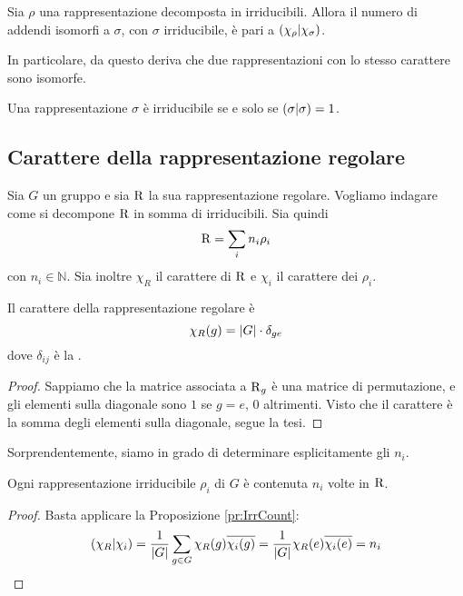 \begin{myprop}\label{pr:IrrCount}
  Sia $\rho$ una rappresentazione decomposta in irriducibili. Allora il numero di addendi isomorfi a $\sigma$, con $\sigma$ irriducibile, è pari a $\left(\chi_\rho | \chi_\sigma\right)$.
\end{myprop}

In particolare, da questo deriva che due rappresentazioni con lo stesso carattere sono isomorfe.

\begin{mytheorem}
  Una rappresentazione $\sigma$ è irriducibile se e solo se $\left(\sigma | \sigma\right)=1$.
\end{mytheorem}

\subsection{Carattere della rappresentazione regolare}
Sia $G$ un gruppo e sia $\operatorname{R}$ la sua rappresentazione regolare. Vogliamo indagare come si decompone $\operatorname{R}$ in somma di irriducibili. Sia quindi
\[
  \operatorname{R} = \sum_i n_i \rho_i
\]
con $n_i \in \mathbb N$. Sia inoltre $\chi_R$ il carattere di $\operatorname{R}$ e $\chi_i$ il carattere dei $\rho_i$.
  
\begin{myprop}
  Il carattere della rappresentazione regolare è
  \[
  \chi_R(g) = \left|G\right| \cdot \delta_{ge}
  \]
  dove $\delta_{ij}$ è la .
\end{myprop}

\begin{proof}
  Sappiamo che la matrice associata a $\operatorname{R}_g$ è una matrice di permutazione, e gli elementi sulla diagonale sono $1$ se $g=e$, $0$ altrimenti. Visto che il carattere è la somma degli elementi sulla diagonale, segue la tesi.
\end{proof}



Sorprendentemente, siamo in grado di determinare esplicitamente gli $n_i$.
\begin{myprop}
  Ogni rappresentazione irriducibile $\rho_i$ di $G$ è contenuta $n_i$ volte in $\operatorname{R}$.
\end{myprop}

\begin{proof}
  Basta applicare la Proposizione \ref{pr:IrrCount}:
  \[
  \left(\chi_R | \chi_i\right) = \frac1{\left|G\right|}\sum_{g\in G} \chi_R(g)\overline{\chi_i(g)} = \frac1{\left|G\right|}\chi_R(e)\overline{\chi_i(e)} = n_i
  \]

\end{proof}

